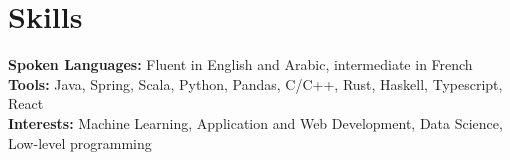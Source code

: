 \documentclass[]{article}
\begin{document}

\section{Skills}
\textbf{Spoken Languages:} Fluent in English and Arabic, intermediate in French\\
\textbf{Tools:} Java, Spring, Scala, Python, Pandas, C/C++, Rust, Haskell, Typescript, React \\
\textbf{Interests:} Machine Learning, Application and Web Development, Data Science, Low-level programming
\end{document}

